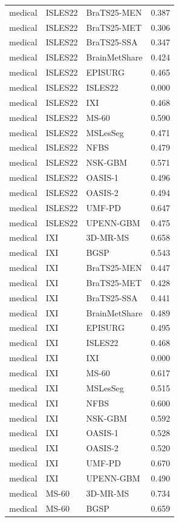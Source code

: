 \begin{tabular}{lllr}
medical & ISLES22 & BraTS25-MEN & 0.387 \\
medical & ISLES22 & BraTS25-MET & 0.306 \\
medical & ISLES22 & BraTS25-SSA & 0.347 \\
medical & ISLES22 & BrainMetShare & 0.424 \\
medical & ISLES22 & EPISURG & 0.465 \\
medical & ISLES22 & ISLES22 & 0.000 \\
medical & ISLES22 & IXI & 0.468 \\
medical & ISLES22 & MS-60 & 0.590 \\
medical & ISLES22 & MSLesSeg & 0.471 \\
medical & ISLES22 & NFBS & 0.479 \\
medical & ISLES22 & NSK-GBM & 0.571 \\
medical & ISLES22 & OASIS-1 & 0.496 \\
medical & ISLES22 & OASIS-2 & 0.494 \\
medical & ISLES22 & UMF-PD & 0.647 \\
medical & ISLES22 & UPENN-GBM & 0.475 \\
medical & IXI & 3D-MR-MS & 0.658 \\
medical & IXI & BGSP & 0.543 \\
medical & IXI & BraTS25-MEN & 0.447 \\
medical & IXI & BraTS25-MET & 0.428 \\
medical & IXI & BraTS25-SSA & 0.441 \\
medical & IXI & BrainMetShare & 0.489 \\
medical & IXI & EPISURG & 0.495 \\
medical & IXI & ISLES22 & 0.468 \\
medical & IXI & IXI & 0.000 \\
medical & IXI & MS-60 & 0.617 \\
medical & IXI & MSLesSeg & 0.515 \\
medical & IXI & NFBS & 0.600 \\
medical & IXI & NSK-GBM & 0.592 \\
medical & IXI & OASIS-1 & 0.528 \\
medical & IXI & OASIS-2 & 0.520 \\
medical & IXI & UMF-PD & 0.670 \\
medical & IXI & UPENN-GBM & 0.490 \\
medical & MS-60 & 3D-MR-MS & 0.734 \\
medical & MS-60 & BGSP & 0.659 \\

\end{tabular}
